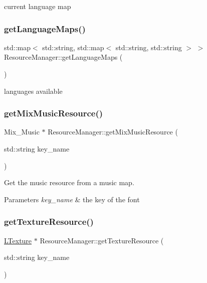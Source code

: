 current language map \mbox{\label{class_resource_manager_a5a6ad6ed582ab791a9139efa2d7b25c5}} 
\subsubsection{\texorpdfstring{get\+Language\+Maps()}{getLanguageMaps()}}
{\footnotesize\ttfamily std\+::map$<$ std\+::string, std\+::map$<$ std\+::string, std\+::string $>$ $>$ Resource\+Manager\+::get\+Language\+Maps (\begin{DoxyParamCaption}{ }\end{DoxyParamCaption})}

languages available \mbox{\label{class_resource_manager_a56bdb8ae19ac9732ff05d3c8d6ac2f14}} 
\subsubsection{\texorpdfstring{get\+Mix\+Music\+Resource()}{getMixMusicResource()}}
{\footnotesize\ttfamily Mix\+\_\+\+Music $\ast$ Resource\+Manager\+::get\+Mix\+Music\+Resource (\begin{DoxyParamCaption}\item[{std\+::string}]{key\+\_\+name }\end{DoxyParamCaption})}



Get the music resource from a music map. 


\begin{DoxyParams}{Parameters}
{\em key\+\_\+name} & the key of the font \\
\hline
\end{DoxyParams}
\mbox{\label{class_resource_manager_a2a0e5923f83935e2592c9d138e556912}} 
\subsubsection{\texorpdfstring{get\+Texture\+Resource()}{getTextureResource()}}
{\footnotesize\ttfamily \mbox{\hyperlink{class_l_texture}{L\+Texture}} $\ast$ Resource\+Manager\+::get\+Texture\+Resource (\begin{DoxyParamCaption}\item[{std\+::string}]{key\+\_\+name }\end{DoxyParamCaption})}



